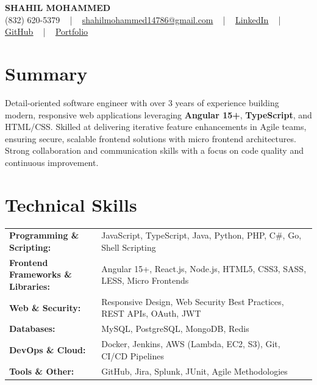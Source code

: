 \documentclass[letterpaper,11pt]{article}
\begin{document}
\begin{center}
    {\fontsize{14pt}{12pt}\selectfont \textbf{\MakeUppercase{Shahil Mohammed}}}\\ \vspace{2pt}
    \fontsize{10pt}{12pt}\selectfont (832) 620-5379 ~ | ~ \href{mailto:shahilmohammed14786@gmail.com}{shahilmohammed14786@gmail.com} ~ | ~  
    \href{https://www.linkedin.com/in/shahil-mohammed-9652931a1/}{\color{blue}\underline{LinkedIn}}  ~ | ~ 
    \href{https://github.com/freakbeast14}{\color{blue}\underline{GitHub}} ~ | ~ 
    \href{https://shahil-mohammed.netlify.app/}{\color{blue}\underline{Portfolio}}
    \vspace{-8pt}
\end{center}

\section{Summary}
\fontsize{9pt}{10pt}\selectfont
Detail-oriented software engineer with over 3 years of experience building modern, responsive web applications leveraging \textbf{Angular 15+}, \textbf{TypeScript}, and HTML/CSS. Skilled at delivering iterative feature enhancements in Agile teams, ensuring secure, scalable frontend solutions with micro frontend architectures. Strong collaboration and communication skills with a focus on code quality and continuous improvement.
 \vspace{-5pt}
 
\section{Technical Skills}
        \vspace{-14pt}
        \begin{table}[h]
            \fontsize{9pt}{10pt}\selectfont
            \begin{tabular}{p{0.3\linewidth} p{0.7\linewidth}}
                \textbf{Programming \& Scripting:} & JavaScript, TypeScript, Java, Python, PHP, C\#, Go, Shell Scripting \\
                \textbf{Frontend Frameworks \& Libraries:} & Angular 15+, React.js, Node.js, HTML5, CSS3, SASS, LESS, Micro Frontends \\
                \textbf{Web \& Security:} & Responsive Design, Web Security Best Practices, REST APIs, OAuth, JWT \\
                \textbf{Databases:} & MySQL, PostgreSQL, MongoDB, Redis \\
                \textbf{DevOps \& Cloud:} & Docker, Jenkins, AWS (Lambda, EC2, S3), Git, CI/CD Pipelines \\
                \textbf{Tools \& Other:} & GitHub, Jira, Splunk, JUnit, Agile Methodologies \\
            \end{tabular}
        \end{table}
 \vspace{-15pt}
 
\end{document}
